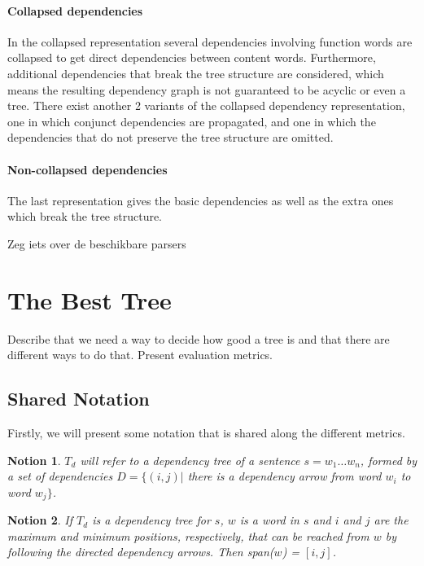 \documentclass{report}
\theoremstyle{indented}
\newtheorem{notion}{Notion}
\begin{document}
\paragraph{Collapsed dependencies} In the collapsed representation several dependencies involving function words are collapsed to get direct dependencies between content words. Furthermore, additional dependencies that break the tree structure are considered, which means the resulting dependency graph is not guaranteed to be acyclic or even a tree. There exist another 2 variants of the collapsed dependency representation, one in which conjunct dependencies are propagated, and one in which the dependencies that do not preserve the tree structure are omitted.
\paragraph{Non-collapsed dependencies} The last representation gives the basic dependencies as well as the extra ones which break the tree structure.

Zeg iets over de beschikbare parsers \cite{de2006generating}

\section{The Best Tree}

Describe that we need a way to decide how good a tree is and that there are different ways to do that. Present evaluation metrics.

\subsection{Shared Notation}

Firstly, we will present some notation that is shared along the different metrics.

\begin{notion}
$T_d$ will refer to a dependency tree of a sentence $s = w_1 \dots w_n$, formed by a set of dependencies $D = \{ (i,j) |$ there is a dependency arrow from word $w_i$ to word $w_j \}$.
\end{notion}

\begin{notion}
If $T_d$ is a dependency tree for $s$, $w$ is a word in $s$ and $i$ and $j$ are the maximum and minimum positions, respectively, that can be reached from $w$ by following the directed dependency arrows. Then span($w$) = $[i,j]$.
\end{notion}
\end{document}
